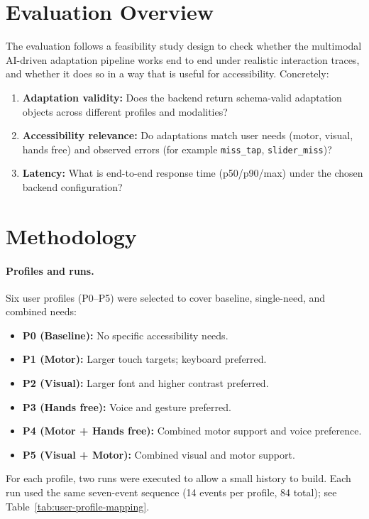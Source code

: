 \documentclass[openany]{book}
\begin{document}
\section{Evaluation Overview}
The evaluation follows a feasibility study design to check whether the multimodal AI-driven adaptation pipeline works end to end under realistic interaction traces, and whether it does so in a way that is useful for accessibility. Concretely:
\begin{enumerate}
  \item \textbf{Adaptation validity:} Does the backend return schema-valid adaptation objects across different profiles and modalities?
  \item \textbf{Accessibility relevance:} Do adaptations match user needs (motor, visual, hands free) and observed errors (for example \texttt{miss\_tap}, \texttt{slider\_miss})?
  \item \textbf{Latency:} What is end-to-end response time (p50/p90/max) under the chosen backend configuration?
\end{enumerate}

\section{Methodology}
\paragraph{Profiles and runs.}
Six user profiles (P0--P5) were selected to cover baseline, single-need, and combined needs:
\begin{itemize}
  \item \textbf{P0 (Baseline):} No specific accessibility needs.
  \item \textbf{P1 (Motor):} Larger touch targets; keyboard preferred.
  \item \textbf{P2 (Visual):} Larger font and higher contrast preferred.
  \item \textbf{P3 (Hands free):} Voice and gesture preferred.
  \item \textbf{P4 (Motor + Hands free):} Combined motor support and voice preference.
  \item \textbf{P5 (Visual + Motor):} Combined visual and motor support.
\end{itemize}
For each profile, two runs were executed to allow a small history to build. Each run used the same seven-event sequence (14 events per profile, 84 total); see Table~\ref{tab:user-profile-mapping}.
\end{document}
